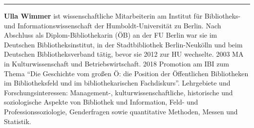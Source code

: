 \begin{center}\rule{0.5\linewidth}{0.5pt}\end{center}

\textbf{Ulla Wimmer} ist wissenschaftliche Mitarbeiterin am Institut für
Bibliotheks- und Informationswissenschaft der Humboldt-Universität zu
Berlin. Nach Abschluss als Diplom-Bibliothekarin (ÖB) an der FU Berlin
war sie im Deutschen Bibliotheksinstitut, in der Stadtbibliothek
Berlin-Neukölln und beim Deutschen Bibliotheksverband tätig, bevor sie
2012 zur HU wechselte. 2003 MA in Kulturwissenschaft und
Betriebswirtschaft. 2018 Promotion am IBI zum Thema ``Die Geschichte vom
großen Ö: die Position der Öffentlichen Bibliotheken im Bibliotheksfeld
und im bibliothekarischen Fachdiskurs''. Lehrgebiete und
Forschungsinteressen: Management-, kulturwissenschaftliche, historische
und soziologische Aspekte von Bibliothek und Information, Feld- und
Professionssoziologie, Genderfragen sowie quantitative Methoden, Messen
und Statistik.
